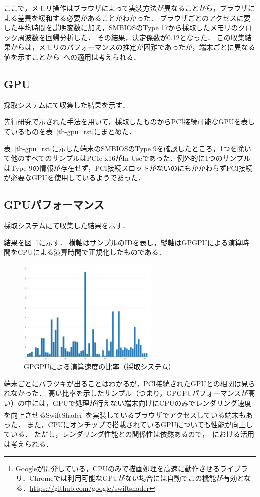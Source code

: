 ここで，メモリ操作はブラウザによって実装方法が異なることから，ブラウザによる差異を緩和する必要があることがわかった．
ブラウザごとのアクセスに要した平均時間を説明変数に加え，SMBIOSのType 17から採取したメモリのクロック周波数を回帰分析した．
その結果，決定係数が0.12となった．
この収集結果からは，メモリのパフォーマンスの推定が困難であったが，端末ごとに異なる値を示すことから\fp~への適用は考えられる．

\subsection{GPU}
採取システムにて収集した結果を示す．

先行研究\cite{mowery2012pixel}で示された手法を用いて，採取したものからPCI接続可能なGPUを表しているものを表~\ref{tb-gpu_rst}にまとめた．



表~\ref{tb-gpu_rst}に示した端末のSMBIOSのType 9を確認したところ，1つを除いて他のすべてのサンプルはPCIe x16がIn Useであった．例外的に1つのサンプルはType 9の情報が存在せず，PCI接続スロットがないのにもかかわらずPCI接続が必要なGPUを使用しているようであった．

\subsection{GPUパフォーマンス}
採取システムにて収集した結果を示す．

結果を図~\ref{fig-gpgpu_rst}に示す．
横軸はサンプルのIDを表し，縦軸はGPGPUによる演算時間をCPUによる演算時間で正規化したものである．

\begin{figure}[H]
    \centering
    \includegraphics[width=0.6\textwidth,pagebox=cropbox]{fig/gpgpu_rst.pdf}
    \caption{GPGPUによる演算速度の比率（採取システム）}
    \label{fig-gpgpu_rst}
\end{figure}

端末ごとにバラツキが出ることはわかるが，PCI接続されたGPUとの相関は見られなかった．
高い比率を示したサンプル（つまり，GPGPUパフォーマンスが高い）の中には，GPUで処理が行えない端末向けにCPUのみでレンダリング速度を向上させるSwiftShader\footnote{Googleが開発している，CPUのみで描画処理を高速に動作させるライブラリ．Chromeでは利用可能なGPUがない場合には自動でこの機能が有効となる．\url{https://github.com/google/swiftshader}}を実装しているブラウザでアクセスしている端末もあった．
また，CPUにオンチップで搭載されているGPUについても性能が向上している．
ただし，レンダリング性能との関係性は依然あるので，\fp~における活用は考えられる．

